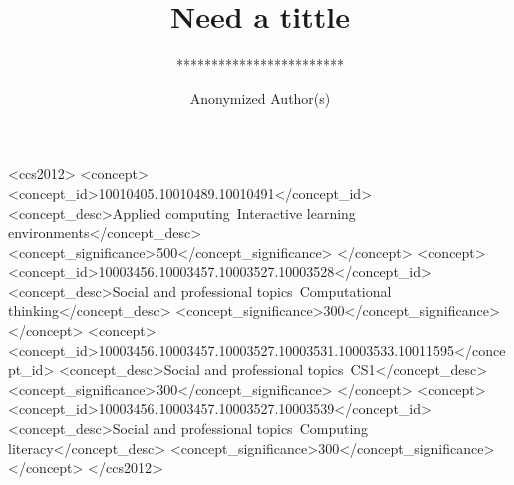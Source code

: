 \documentclass[sigconf]{acmart}
\begin{document}
\fancyhead{}

\title{Need a tittle}
\subtitle{************************}




\author{Anonymized Author(s)}




% 

\begin{abstract}

\end{abstract}

%
%
\begin{CCSXML}
	<ccs2012>
	<concept>
	<concept_id>10010405.10010489.10010491</concept_id>
	<concept_desc>Applied computing~Interactive learning environments</concept_desc>
	<concept_significance>500</concept_significance>
	</concept>
	<concept>
	<concept_id>10003456.10003457.10003527.10003528</concept_id>
	<concept_desc>Social and professional topics~Computational thinking</concept_desc>
	<concept_significance>300</concept_significance>
	</concept>
	<concept>
	<concept_id>10003456.10003457.10003527.10003531.10003533.10011595</concept_id>
	<concept_desc>Social and professional topics~CS1</concept_desc>
	<concept_significance>300</concept_significance>
	</concept>
	<concept>
	<concept_id>10003456.10003457.10003527.10003539</concept_id>
	<concept_desc>Social and professional topics~Computing literacy</concept_desc>
	<concept_significance>300</concept_significance>
	</concept>
	</ccs2012>
\end{CCSXML}
\end{document}
